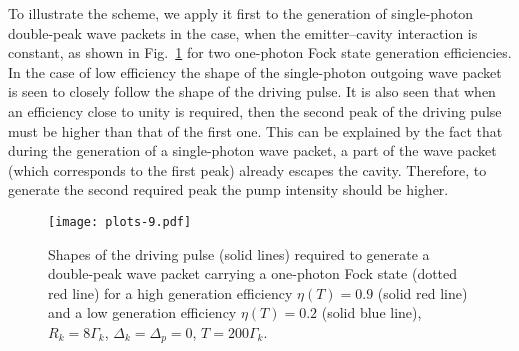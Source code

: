 \documentclass[pra, twocolumn]{revtex4}
\begin{document}
To illustrate the
%
scheme,
we
apply it first to
the generation of
single-photon double-peak wave packets
in the case, when the emitter--cavity interaction is constant,
%
as shown in
Fig.~\ref{fig7} for two one-photon Fock state generation efficiencies.
%
In the case of low efficiency the shape of the single-photon
outgoing wave packet is seen to closely follow
the shape of the driving pulse. It is also seen that
when an efficiency close to
unity is required, then the second peak of the driving pulse must be
higher than that of the first one.
This can be explained by the fact that during the generation of
a single-photon wave packet, a part of the wave packet (which
corresponds to the first peak)
already escapes
the cavity. Therefore, to generate the second required peak the
pump intensity should be higher.
\begin{figure}[t!]
	\texttt{[image: plots-9.pdf]}
 	\caption{
          Shapes
          of the driving pulse (solid lines) required to
          generate
%          
          a double-peak wave packet carrying a one-photon Fock state
          (dotted red line) for a high generation efficiency $\eta(T)=0.9$
          (solid red line) and a low generation efficiency $\eta(T)=0.2$ (solid blue line),
          $R_k = 8\Gamma_k$, \mbox{$\Delta_k = \Delta_p = 0$}, \mbox{$T = 200 \Gamma_k$}.}
	\label{fig7}
\end{figure}
\end{document}
